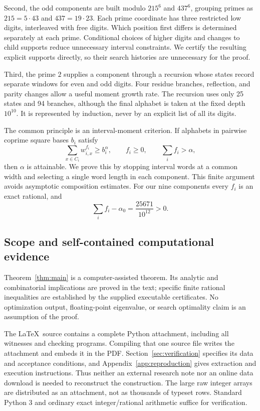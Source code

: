 \documentclass[11pt]{article}
\theoremstyle{definition}
\theoremstyle{remark}
\newcommand{\al}{\alpha_0}
\begin{document}
Second, the odd components are built modulo $215^6$ and $437^6$, grouping
primes as $215=5\cdot43$ and $437=19\cdot23$. Each prime coordinate has
three restricted low digits, interleaved with free digits. Which position
first differs is determined separately at each prime. Conditional choices
of higher digits and changes to child supports reduce unnecessary interval
constraints. We certify the resulting explicit supports directly, so their
search histories are unnecessary for the proof.

Third, the prime $2$ supplies a component through a recursion whose states
record separate windows for even and odd digits. Four residue branches,
reflection, and parity changes allow a useful moment growth rate. The
recursion uses only 25 states and 94 branches, although the final alphabet
is taken at the fixed depth $10^{10}$. It is represented by induction, never
by an explicit list of all its digits.

The common principle is an interval-moment criterion. If alphabets in
pairwise coprime square bases $b_i$ satisfy
\begin{equation}\label{eq:introcriterion}
 \sum_{x\in C_i}w_{i,x}^{f_i}\ge b_i^\alpha,
 \qquad f_i\ge0,\qquad \sum_i f_i>\alpha,
\end{equation}
then $\alpha$ is attainable. We prove this by stopping interval words at a
common width and selecting a single word length in each component. This
finite argument avoids asymptotic composition estimates. For our nine
components every $f_i$ is an exact rational, and
\begin{equation}\label{eq:introsurplus}
 \sum_i f_i-\al=\frac{25671}{10^{12}}>0.
\end{equation}

\subsection{Scope and self-contained computational evidence}
Theorem~\ref{thm:main} is a computer-assisted theorem. Its analytic and
combinatorial implications are proved in the text; specific finite rational
inequalities are established by the supplied executable certificates.
No optimization output, floating-point eigenvalue, or search optimality
claim is an assumption of the proof.

The \LaTeX\ source contains a complete Python attachment, including all
witnesses and checking programs. Compiling that one source file writes the
attachment and embeds it in the PDF. Section~\ref{sec:verification} specifies
its data and acceptance conditions, and Appendix~\ref{app:reproduction}
gives extraction and execution instructions. Thus neither an external
research note nor an online data download is needed to reconstruct the
construction. The large raw integer arrays are distributed as an attachment,
not as thousands of typeset rows. Standard Python 3 and ordinary exact
integer/rational arithmetic suffice for verification.
\end{document}
